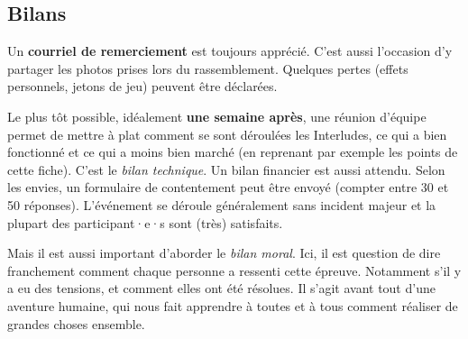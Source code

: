 \subsection{Bilans}

Un \textbf{courriel de remerciement} est toujours apprécié. C'est aussi l'occasion d'y partager les photos prises lors du rassemblement. Quelques pertes (effets personnels, jetons de jeu) peuvent être déclarées.

Le plus tôt possible, idéalement \textbf{une semaine après}, une réunion d'équipe permet de mettre à plat comment se sont déroulées les Interludes, ce qui a bien fonctionné et ce qui a moins bien marché (en reprenant par exemple les points de cette fiche). C'est le \emph{bilan technique}. Un bilan financier est aussi attendu. Selon les envies, un formulaire de contentement peut être envoyé (compter entre 30 et 50 réponses). L'événement se déroule généralement sans incident majeur et la plupart des participant·e·s sont (très) satisfaits.

Mais il est aussi important d'aborder le \emph{bilan moral}. Ici, il est question de dire franchement comment chaque personne a ressenti cette épreuve. Notamment s'il y a eu des tensions, et comment elles ont été résolues. Il s'agit avant tout d'une aventure humaine, qui nous fait apprendre à toutes et à tous comment réaliser de grandes choses ensemble.


